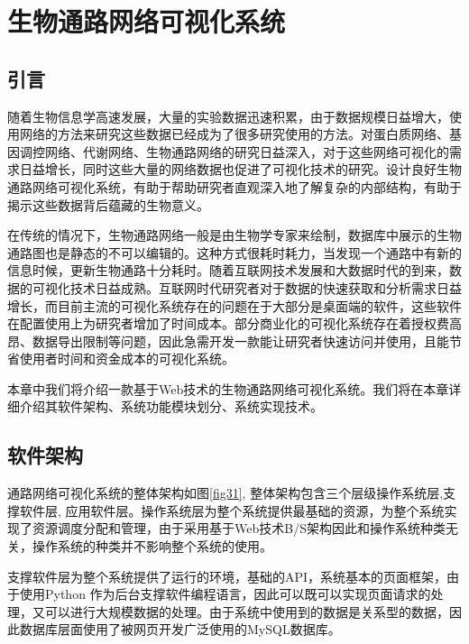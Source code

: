 \chapter{生物通路网络可视化系统}
\section{引言}
随着生物信息学高速发展，大量的实验数据迅速积累，由于数据规模日益增大，使用网络的方法来研究这些数据已经成为了很多研究使用的方法。对蛋白质网络、基因调控网络、代谢网络、生物通路网络的研究日益深入，对于这些网络可视化的需求日益增长，同时这些大量的网络数据也促进了可视化技术的研究。设计良好生物通路网络可视化系统，有助于帮助研究者直观深入地了解复杂的内部结构，有助于揭示这些数据背后蕴藏的生物意义。

在传统的情况下，生物通路网络一般是由生物学专家来绘制，数据库中展示的生物通路图也是静态的不可以编辑的。这种方式很耗时耗力，当发现一个通路中有新的信息时候，更新生物通路十分耗时。随着互联网技术发展和大数据时代的到来，数据的可视化技术日益成熟。互联网时代研究者对于数据的快速获取和分析需求日益增长，而目前主流的可视化系统存在的问题在于大部分是桌面端的软件，这些软件在配置使用上为研究者增加了时间成本。部分商业化的可视化系统存在着授权费高昂、数据导出限制等问题，因此急需开发一款能让研究者快速访问并使用，且能节省使用者时间和资金成本的可视化系统。

本章中我们将介绍一款基于Web技术的生物通路网络可视化系统。我们将在本章详细介绍其软件架构、系统功能模块划分、系统实现技术。

\section{软件架构}
通路网络可视化系统的整体架构如图\ref{fig31}, 整体架构包含三个层级操作系统层,支撑软件层, 应用软件层。操作系统层为整个系统提供最基础的资源，为整个系统实现了资源调度分配和管理，由于采用基于Web技术B/S架构因此和操作系统种类无关，操作系统的种类并不影响整个系统的使用。

支撑软件层为整个系统提供了运行的环境，基础的API，系统基本的页面框架，由于使用Python 作为后台支撑软件编程语言，因此可以既可以实现页面请求的处理，又可以进行大规模数据的处理。由于系统中使用到的数据是关系型的数据，因此数据库层面使用了被网页开发广泛使用的MySQL数据库。

